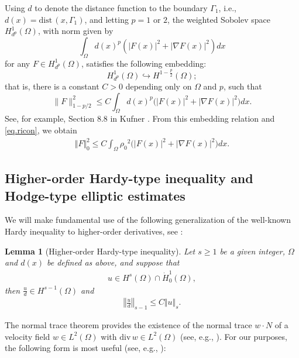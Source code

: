 \documentclass[12pt,twoside,reqno]{amsart}
\numberwithin{equation}{section}
\newtheorem{lemma}[theorem]{Lemma}
\theoremstyle{definition}
\theoremstyle{remark}
\begin{document}
Using $d$ to denote the distance function to the boundary ${\Gamma_1}$, i.e., $d(x)={\mathrm{dist}\,}(x,{\Gamma_1})$,  and letting $p=1$ or $2$, the weighted Sobolev space  $H^1_{d^p}(\Omega)$, with norm given by
$$\int_\Omega d(x)^p (|F(x)|^2+| {\nabla} F (x)|^2 ) dx$$ for any $F \in H^1_{d^p}(\Omega)$,
satisfies the following embedding:
$$H^1_{d^p}(\Omega) \hookrightarrow   H^{1 - \frac{p}{2}}(\Omega);$$
that is, there is a constant $C>0$ depending only on $\Omega$ and $p$, such that
\begin{equation}\label{w-embed}
\|F\|_{1-p/2} ^2 {\leqslant} C \int_\Omega d(x)^p \bigl(|F(x)|^2 + \left|{\nabla} F(x) \right|^2\bigr)  dx.
\end{equation}
See, for example,  Section 8.8 in Kufner \cite{Ku85}. From this embedding relation and \eqref{eq.ricon}, we obtain
\begin{align}\label{w-em}
  {\Vert{F}\Vert}_0^2{\leqslant} C\int_\Omega {\rho_0}^2 \bigl(|F(x)|^2 + \left|{\nabla} F(x) \right|^2\bigr)  dx.
\end{align}

\subsection{Higher-order Hardy-type inequality and Hodge-type elliptic estimates}\label{sec.3}

We will make fundamental use of the following generalization of the well-known Hardy
inequality to higher-order derivatives, see \cite[Lemma 3.1]{CS12}:
\begin{lemma}[Higher-order Hardy-type inequality] \label{lem.Hardy}
  Let $s{\geqslant} 1$ be a given integer, $\Omega$ and $d(x)$ be defined as above, and suppose that
  \begin{align*}
    u\in H^s(\Omega)\cap \dot{H}_0^1(\Omega),
  \end{align*}
  then $\frac{u}{d}\in H^{s-1}(\Omega)$ and
  \begin{align}\label{Hardy.1}
    {\left\Vert{\frac{u}{d}}\right\Vert}_{s-1}{\leqslant} C{\Vert{u}\Vert}_s.
  \end{align}
\end{lemma}

The normal trace theorem  provides  the existence of the
normal trace $w \cdot N$ of a velocity field $w\in L^2(\Omega)$ with
${\mathrm{div}\,} w \in L^2(\Omega) $ (see, e.g., \cite{Temam84}). For our purposes, the following
form is most useful (see, e.g., \cite{CCS08}):
\end{document}
